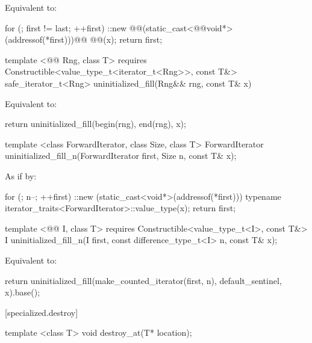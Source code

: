 \pnum
\effects Equivalent to:
\begin{codeblock}
    for (; first != last; ++first) {
      ::new @@(static_cast<@@void*>(addressof(*first)))@\added{)}@
        @@(x);
    }
    return first;
\end{codeblock}

{\color{addclr}
\begin{codeblock}
template <@@ Rng, class T>
requires
  Constructible<value_type_t<iterator_t<Rng>>, const T&>
safe_iterator_t<Rng> uninitialized_fill(Rng&& rng, const T& x)
\end{codeblock}

\pnum
\effects Equivalent to:
\begin{codeblock}
    return uninitialized_fill(begin(rng), end(rng), x);
\end{codeblock}
} %

{\color{remclr}
\begin{codeblock}
template <class ForwardIterator, class Size, class T>
  ForwardIterator uninitialized_fill_n(ForwardIterator first, Size n, const T& x);
\end{codeblock}

\setcounter{Paras}{1}
\pnum
\effects As if by:
\begin{codeblock}
        for (; n--; ++first)
          ::new (static_cast<void*>(addressof(*first)))
            typename iterator_traits<ForwardIterator>::value_type(x);
        return first;
\end{codeblock}
} %

{\color{addclr}
\begin{codeblock}
template <@@ I, class T>
requires
  Constructible<value_type_t<I>, const T&>
I uninitialized_fill_n(I first, const difference_type_t<I> n, const T& x);
\end{codeblock}

\setcounter{Paras}{3}
\pnum
\effects Equivalent to:
\begin{codeblock}
    return uninitialized_fill(make_counted_iterator(first, n), default_sentinel{}, x).base();
\end{codeblock}
} %

[specialized.destroy]{}
{\color{remclr}
\begin{codeblock}
template <class T>
  void destroy_at(T* location);
\end{codeblock}
} %


